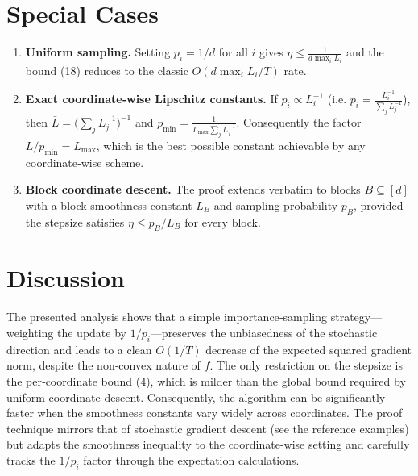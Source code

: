 \documentclass{article}
\begin{document}
\section*{Special Cases}
\begin{enumerate}[label=\alph*)]
\item \textbf{Uniform sampling.}
    Setting $p_i=1/d$ for all $i$ gives $\eta\le \frac{1}{d\max_i L_i}$
    and the bound (18) reduces to the classic $O(d\max_i L_i/T)$ rate.

\item \textbf{Exact coordinate‑wise Lipschitz constants.}
    If $p_i\propto L_i^{-1}$ (i.e. $p_i = \frac{L_i^{-1}}{\sum_j L_j^{-1}}$),
    then $\bar L = \bigl(\sum_j L_j^{-1}\bigr)^{-1}$ and $p_{\min}
    = \frac{1}{L_{\max}\sum_j L_j^{-1}}$.
    Consequently the factor $\bar L/p_{\min}=L_{\max}$, which is the
    best possible constant achievable by any coordinate‑wise scheme.

\item \textbf{Block coordinate descent.}
    The proof extends verbatim to blocks $B\subseteq[d]$ with a block
    smoothness constant $L_B$ and sampling probability $p_B$,
    provided the stepsize satisfies $\eta\le p_B/L_B$ for every block.
\end{enumerate}

\section*{Discussion}
The presented analysis shows that a simple importance‑sampling
strategy—weighting the update by $1/p_i$—preserves the unbiasedness of
the stochastic direction and leads to a clean $O(1/T)$ decrease of the
expected squared gradient norm, despite the non‑convex nature of $f$.
The only restriction on the stepsize is the per‑coordinate bound
(4), which is milder than the global bound required by uniform
coordinate descent. Consequently, the algorithm can be significantly
faster when the smoothness constants vary widely across coordinates.
The proof technique mirrors that of stochastic gradient descent
(see the reference examples) but adapts the smoothness inequality to
the coordinate‑wise setting and carefully tracks the $1/p_i$ factor
through the expectation calculations.
\end{document}
